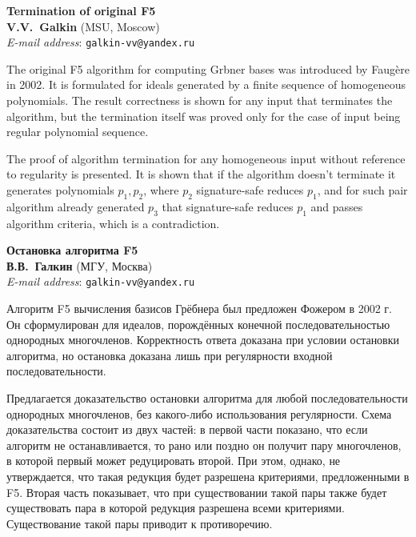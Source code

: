 \documentclass[A4, 12pt, twoside]{article}
\begin{document}
\begin{center} \textbf{
	Termination of original F5 \\[.3cm]
	V.V.~Galkin}  (MSU, Moscow) \\
	\emph{E-mail address}: \texttt{galkin-vv@yandex.ru}\\[.3cm]
\end{center}
\normalsize

The original F5 algorithm for computing Grbner bases was introduced by Faug\`{e}re in 2002.
It is formulated for ideals generated by a finite sequence of homogeneous polynomials.
The result correctness is shown for any input that terminates the algorithm,
but the termination itself was proved only for the case of input being regular polynomial sequence.

The proof of algorithm termination for any homogeneous input without reference to regularity is presented.
It is shown that if the algorithm doesn't terminate it generates polynomials $p_1, p_2$, where $p_2$ signature-safe reduces $p_1$,
and for such pair algorithm already generated $p_3$ that signature-safe reduces $p_1$ and passes algorithm criteria, which is a contradiction.




\begin{center} \textbf{
	Остановка алгоритма F5 \\[.3cm]
	В.В.~Галкин}  (МГУ, Москва) \\
	\emph{E-mail address}: \texttt{galkin-vv@yandex.ru}\\[.3cm]
\end{center}
\normalsize
Алгоритм F5 вычисления базисов Грёбнера был предложен Фожером в 2002 г.
Он сформулирован для идеалов, порождённых конечной последовательностью однородных многочленов.
Корректность ответа доказана при условии остановки алгоритма, 
но остановка доказана лишь при регулярности входной последовательности.

Предлагается доказательство остановки алгоритма для любой последовательности однородных многочленов, без какого-либо использования регулярности.
Схема доказательства состоит из двух частей: в первой части показано, что если алгоритм
не останавливается, то рано или поздно он получит пару многочленов,
в которой первый может редуцировать второй. При этом, однако, не утверждается,
что такая редукция будет разрешена критериями, предложенными в F5.
Вторая часть показывает, что при существовании такой пары также будет
существовать пара в которой редукция разрешена всеми критериями. Существование
такой пары приводит к противоречию.
\end{document}
